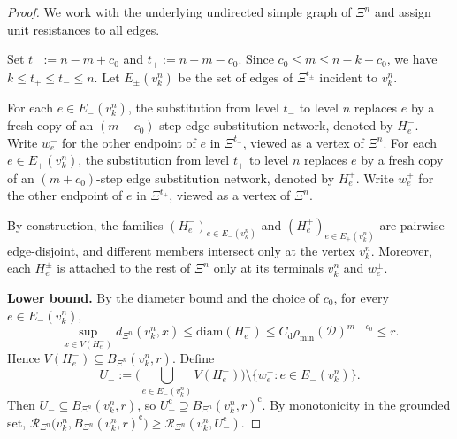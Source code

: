 \documentclass{article}
\theoremstyle{plain}
\theoremstyle{definition}
\newcommand{\dist}{\mathrm{d}}
\newcommand{\diam}{\mathrm{diam}}
\newcommand{\Reff}{\mathscr{R}}
\begin{document}
\begin{proof}
We work with the underlying undirected simple graph of $\Xi^n$ and assign unit resistances to all edges.

Set
$
t_-:=n-m+c_0
$
and
$
t_+:=n-m-c_0.
$
Since $c_0\le m\le n-k-c_0$, we have $k\le t_+\le t_-\le n$.
Let $E_\pm(v_k^n)$ be the set of edges of $\Xi^{t_\pm}$ incident to $v_k^n$.

For each $e\in E_-(v_k^n)$, the substitution from level $t_-$ to level $n$ replaces $e$ by a fresh copy of an $(m-c_0)$-step edge substitution network, denoted by $H_e^-$.
Write $w_e^-$ for the other endpoint of $e$ in $\Xi^{t_-}$, viewed as a vertex of $\Xi^n$.
For each $e\in E_+(v_k^n)$, the substitution from level $t_+$ to level $n$ replaces $e$ by a fresh copy of an $(m+c_0)$-step edge substitution network, denoted by $H_e^+$.
Write $w_e^+$ for the other endpoint of $e$ in $\Xi^{t_+}$, viewed as a vertex of $\Xi^n$.

By construction, the families $(H_e^-)_{e\in E_-(v_k^n)}$ and $(H_e^+)_{e\in E_+(v_k^n)}$ are pairwise edge-disjoint, and different members intersect only at the vertex $v_k^n$.
Moreover, each $H_e^\pm$ is attached to the rest of $\Xi^n$ only at its terminals $v_k^n$ and $w_e^\pm$.

\textbf{Lower bound.}
By the diameter bound and the choice of $c_0$, for every $e\in E_-(v_k^n)$,
\[
\sup_{x\in V(H_e^-)} d_{\Xi^n}(v_k^n,x)
\le
\diam(H_e^-)
\le
C_{\dist}\rho_{\min}(\mathcal D)^{m-c_0}
\le
r.
\]
Hence $V(H_e^-)\subseteq B_{\Xi^n}(v_k^n,r)$.
Define
\[
U_-:=
\Big(\bigcup_{e\in E_-(v_k^n)} V(H_e^-)\Big)
\setminus
\{w_e^-:e\in E_-(v_k^n)\}.
\]
Then $U_-\subseteq B_{\Xi^n}(v_k^n,r)$, so $U_-^{\mathrm c}\supseteq B_{\Xi^n}(v_k^n,r)^{\mathrm c}$.
By monotonicity in the grounded set,
$
\Reff_{\Xi^n}\bigl(v_k^n,B_{\Xi^n}(v_k^n,r)^{\mathrm c}\bigr)
\ge
\Reff_{\Xi^n}(v_k^n,U_-^{\mathrm c}).
$


\end{proof}
\end{document}
